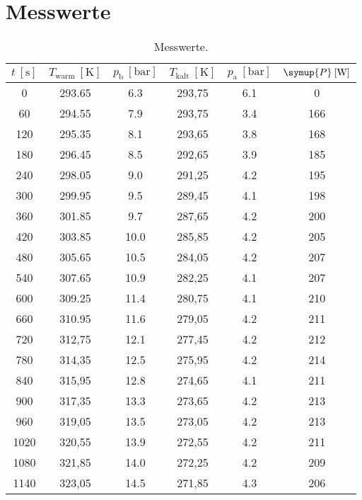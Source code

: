 \section{Messwerte}
\label{sec:anhang}

\begin{table}
  \centering
  \caption{Messwerte.}
  \label{tab:Messwerte}
  \begin{tabular}{S[table-format=2.0] S[table-format=2.1]
                  S[table-format=2.1] S[table-format=2.1]
                  S[table-format=1.1] S[table-format=3.0]}
    \toprule
    {$t \: [\si{\second}]$}
    & {$T_\text{warm} \: [\si{\kelvin}]$}
    & {$p_\text{b} \: [\si{\bar}]$}
    & {$T_\text{kalt} \: [\si{\kelvin}]$}
    & {$p_\text{a} \: [\si{\bar}]$}
    & {$\symup{P} \: [\si{\watt}]$} \\
     & 293.65 & 6.3  & 293,75 & 6.1 &   0 \\
   60 & 294.55 & 7.9  & 293,75 & 3.4 & 166 \\
  120 & 295.35 & 8.1  & 293,65 & 3.8 & 168 \\
  180 & 296.45 & 8.5  & 292,65 & 3.9 & 185 \\
  240 & 298.05 & 9.0  & 291,25 & 4.2 & 195 \\
  300 & 299.95 & 9.5  & 289,45 & 4.1 & 198 \\
  360 & 301.85 & 9.7  & 287,65 & 4.2 & 200 \\
  420 & 303.85 & 10.0 & 285,85 & 4.2 & 205 \\
  480 & 305.65 & 10.5 & 284,05 & 4.2 & 207 \\
  540 & 307.65 & 10.9 & 282,25 & 4.1 & 207 \\
  600 & 309.25 & 11.4 & 280,75 & 4.1 & 210 \\
  660 & 310.95 & 11.6 & 279,05 & 4.2 & 211 \\
  720 & 312,75 & 12.1 & 277,45 & 4.2 & 212 \\
  780 & 314,35 & 12.5 & 275,95 & 4.2 & 214 \\
  840 & 315,95 & 12.8 & 274,65 & 4.1 & 211 \\
  900 & 317,35 & 13.3 & 273,65 & 4.2 & 213 \\
  960 & 319,05 & 13.5 & 273,05 & 4.2 & 213 \\
  1020 & 320,55 & 13.9 & 272,55 & 4.2 & 211 \\
  1080 & 321,85 & 14.0 & 272,25 & 4.2 & 209 \\
  1140 & 323,05 & 14.5 & 271,85 & 4.3 & 206 \\
   \bottomrule
 \end{tabular}
\end{table}
